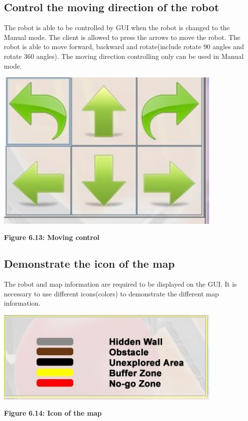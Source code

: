 \documentclass[11pt, a4paper]{report}
\begin{document}
\subsection{Control the moving direction of the robot}
The robot is able to be controlled by GUI when the robot is changed to the Manual mode. The client is allowed to press the arrows to move the robot. The robot is able to move forward, backward and rotate(include rotate 90 angles and rotate 360 angles). The moving direction controlling only can be used in Manual mode.
 \begin{center}
 \includegraphics[width=11.20cm]{ControlButton.jpg}
\end{center}
\begin{center}
\textbf {Figure 6.13: Moving control} \\[0.3cm]
\end{center}
\subsection{Demonstrate the icon of the map}
The robot and map information are required to be displayed on the GUI. It is necessary to use different icons(colors) to demonstrate the different map information.
  \begin{center}
 \includegraphics[width=11.20cm]{IconInformation.jpg}
\end{center}
\begin{center}
\textbf {Figure 6.14: Icon of the map} \\[0.3cm]
\end{center}
\end{document}
